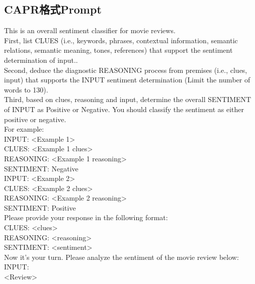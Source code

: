 \documentclass{article}
\begin{document}
\subsection{CAPR格式Prompt}
This is an overall sentiment classifier for movie reviews.\\
First, list CLUES (i.e., keywords, phrases, contextual information, semantic relations, semantic meaning, tones, references) that support the sentiment determination of input..\\
Second, deduce the diagnostic REASONING process from premises (i.e., clues, input) that supports the INPUT sentiment determination (Limit the number of words to 130).\\
Third, based on clues, reasoning and input, determine the overall SENTIMENT of INPUT as Positive or Negative. You should classify the sentiment as either positive or negative.\\

For example:\\
INPUT: <Example 1>\\
CLUES: <Example 1 clues>\\
REASONING: <Example 1 reasoning>\\
SENTIMENT: Negative\\

INPUT: <Example 2>\\
CLUES: <Example 2 clues>\\
REASONING: <Example 2 reasoning>\\
SENTIMENT: Positive\\

Please provide your response in the following format:\\
CLUES: <clues>\\
REASONING: <reasoning>\\
SENTIMENT: <sentiment>\\

Now it's your turn. Please analyze the sentiment of the movie review below:\\
INPUT: \\
<Review>\\
\end{document}
